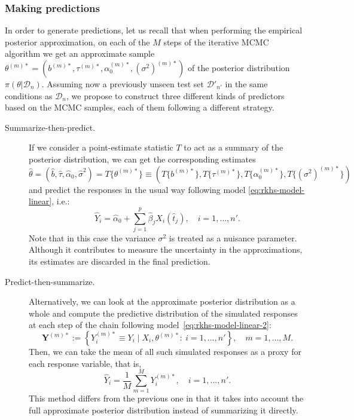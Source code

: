 \subsubsection{Making predictions}

In order to generate predictions, let us recall that when performing the empirical posterior approximation, on each of the \(M\) steps of the iterative MCMC algorithm we get an approximate sample \(\theta^{(m)*}=(b^{(m)*}, \tau^{(m)*}, \alpha_0^{(m)*}, (\sigma^2)^{(m)*})\) of the posterior distribution \(\pi(\theta| \mathcal D_n)\). Assuming now a previously unseen test set \(\mathcal D'_{n'}\) in the same conditions as \(\mathcal D_n\), we propose to construct three different kinds of predictors based on the MCMC samples, each of them following a different strategy.

\begin{description}
  \item[Summarize-then-predict.] If we consider a point-estimate statistic \(T\) to act as a summary of the posterior distribution, we can get the corresponding estimates \(\hat{\theta}=(\hat b, \hat \tau, \hat{\alpha}_0, \hat{\sigma}^2) = T\{\theta^{(m)*}\} \equiv (T\{b^{(m)*}\}, T\{\tau^{(m)*}\}, T\{\alpha_0^{(m)*}\}, T\{(\sigma^2)^{(m)*}\})\) and predict the responses in the usual way following model \eqref{eq:rkhs-model-linear}, i.e.:
  \[
    \hat Y_i = \hat{\alpha}_0 + \sum_{j=1}^p \hat{\beta}_j X_i(\hat{t}_j), \quad i=1,\dots, n'.
  \]
  Note that in this case the variance \(\sigma^2\) is treated as a nuisance parameter. Although it contributes to measure the uncertainty in the approximations, its estimates are discarded in the final prediction.

  \item[Predict-then-summarize.] Alternatively, we can  look at the approximate posterior distribution as a whole and compute the predictive distribution of the simulated responses at each step of the chain following model~\eqref{eq:rkhs-model-linear-2}:
  \begin{equation}\label{eq:sampled-response-vector}
  \symbf Y^{(m)*} := \left\{Y_i^{(m)*} \equiv Y_i \mid X_i, \theta^{(m)*}:\ i=1,\dots,n'\right\}, \quad m=1,\dots,M.
  \end{equation}
  Then, we can take the mean of all such simulated responses as a proxy for each response variable, that is,
  \[
  \hat Y_i = \frac{1}{M}\sum_{m=1}^M Y_i^{(m)*}, \quad i=1,\dots,n'.
  \]
  This method differs from the previous one in that it takes into account the full approximate posterior distribution instead of summarizing it directly.


\end{description}
